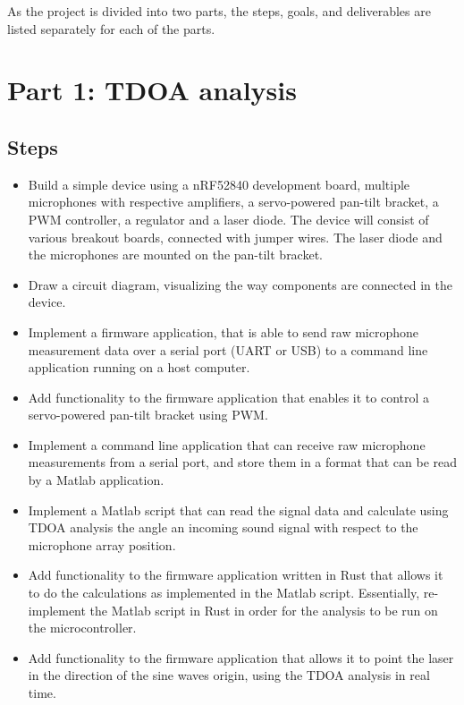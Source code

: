 \documentclass[a4paper]{article}
\begin{document}
As the project is divided into two parts, the steps, goals, and deliverables are listed separately for each of the parts.

\section{Part 1: TDOA analysis}

\subsection{Steps}
\begin{itemize}
    \item Build a simple device using a nRF52840 development board, multiple microphones with respective amplifiers, a servo-powered pan-tilt bracket, a PWM controller, a regulator and a laser diode. The device will consist of various breakout boards, connected with jumper wires. The laser diode and the microphones are mounted on the pan-tilt bracket.
    \item Draw a circuit diagram, visualizing the way components are connected in the device.
    \item Implement a firmware application, that is able to send raw microphone measurement data over a serial port (UART \cite{uart} or USB) to a command line application running on a host computer.
    \item Add functionality to the firmware application that enables it to control a servo-powered pan-tilt bracket using PWM.
    \item Implement a command line application that can receive raw microphone measurements from a serial port, and store them in a format that can be read by a Matlab application.
    \item Implement a Matlab script that can read the signal data and calculate using 
    TDOA analysis the angle an incoming sound signal with respect to the microphone array position.
    \item Add functionality to the firmware application written in Rust that allows it to do the calculations as implemented in the Matlab script. Essentially, re-implement the Matlab script in Rust in order for the analysis to be run on the microcontroller.
    \item Add functionality to the firmware application that allows it to point the laser in the direction of the sine waves origin, using the TDOA analysis in real time.
\end{itemize} 
\end{document}
